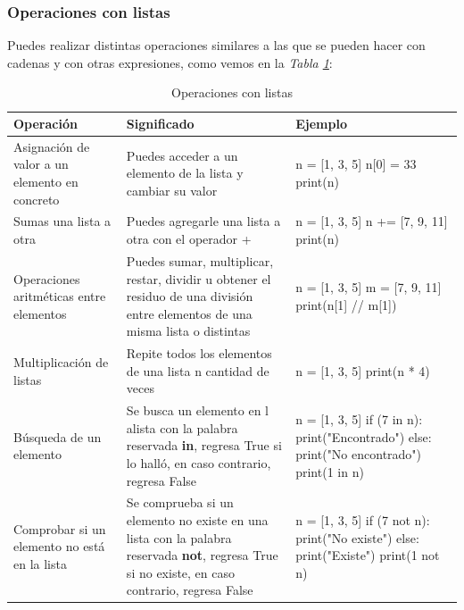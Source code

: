 \subsubsection{Operaciones con listas}
\hspace{0.55cm}Puedes realizar distintas operaciones similares a las que se pueden hacer con cadenas y con otras expresiones, como vemos en la \textit{Tabla \ref{tab: 7}}:
\begin{table}[H]
    \begin{center}
        \caption{Operaciones con listas}
        \label{tab: 7}
        \begin{tabular}{m{4cm}|m{4cm}|m{4cm}}
            \hline
            \textbf{Operación} & \textbf{Significado} & \textbf{Ejemplo} \\
            \hline
            Asignación de valor a un elemento en concreto	 	& Puedes acceder a un elemento de la lista y cambiar su valor		& n = [1, 3, 5] n[0] = 33 print(n) \\
            Sumas una lista a otra							& Puedes agregarle una lista a otra con el operador +				& n = [1, 3, 5] n += [7, 9, 11] print(n) \\
            Operaciones aritméticas entre elementos			& Puedes sumar, multiplicar, restar, dividir u obtener el residuo de una división entre elementos de una misma lista o distintas																								& n = [1, 3, 5] m = [7, 9, 11] print(n[1] // m[1]) \\
            Multiplicación de listas							& Repite todos los elementos de una lista n cantidad de veces		& n = [1, 3, 5] print(n * 4) \\
            Búsqueda de un elemento							& Se busca un elemento en l alista con la palabra reservada \textbf{in}, regresa True si lo halló, en caso contrario, regresa False																								& n = [1, 3, 5] if (7 in n): print("Encontrado") else: print("No encontrado") print(1 in n) \\
            Comprobar si un elemento no está en la lista		& Se comprueba si un elemento no existe en una lista con la palabra reservada \textbf{not}, regresa True si no existe, en caso contrario, regresa False																	& n = [1, 3, 5] if (7 not n): print("No existe") else: print("Existe") print(1 not n) \\
            \hline
        \end{tabular}
    \end{center}    
\end{table}


